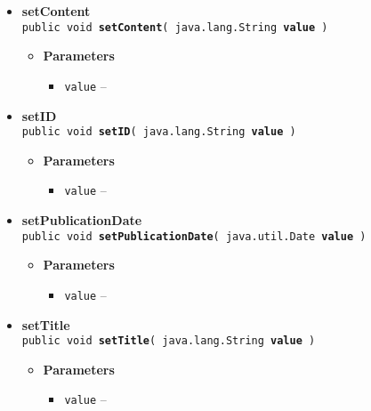 {{{\begin{itemize}
{\begin{itemize}
\item{
{\bf Parameters}
  \begin{itemize}
   \item{
{\tt value} -- }
  \end{itemize}
}%
\end{itemize}
}%
 \item{ 
{\bf setContent}\\
{\tt public void\ {\bf setContent}( {\tt java.lang.String} {\bf value} )
\label{amber.common.Story.setContent(java.lang.String)}}%
\begin{itemize}
\item{
{\bf Parameters}
  \begin{itemize}
   \item{
{\tt value} -- }
  \end{itemize}
}%
\end{itemize}
}%
 \item{ 
{\bf setID}\\
{\tt public void\ {\bf setID}( {\tt java.lang.String} {\bf value} )
\label{amber.common.Story.setID(java.lang.String)}}%
\begin{itemize}
\item{
{\bf Parameters}
  \begin{itemize}
   \item{
{\tt value} -- }
  \end{itemize}
}%
\end{itemize}
}%
 \item{ 
{\bf setPublicationDate}\\
{\tt public void\ {\bf setPublicationDate}( {\tt java.util.Date} {\bf value} )
\label{amber.common.Story.setPublicationDate(java.util.Date)}}%
\begin{itemize}
\item{
{\bf Parameters}
  \begin{itemize}
   \item{
{\tt value} -- }
  \end{itemize}
}%
\end{itemize}
}%
 \item{ 
{\bf setTitle}\\
{\tt public void\ {\bf setTitle}( {\tt java.lang.String} {\bf value} )
\label{amber.common.Story.setTitle(java.lang.String)}}%
\begin{itemize}
\item{
{\bf Parameters}
  \begin{itemize}
   \item{
{\tt value} -- }
  \end{itemize}
}%
\end{itemize}
}%
\end{itemize}
}
}
}
